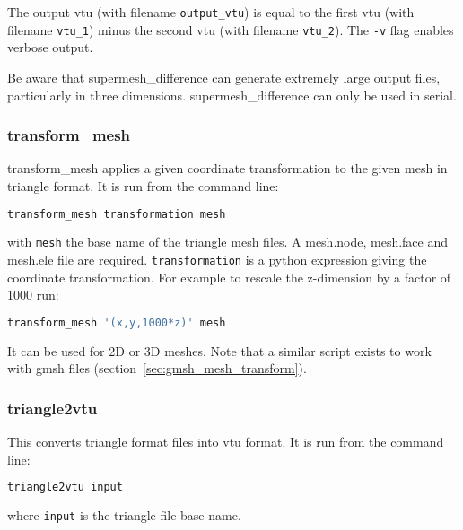 The output vtu (with filename \lstinline[language = Bash]+output_vtu+)
is equal to the first vtu (with filename \lstinline[language = Bash]+vtu_1+)
minus the second vtu (with filename \lstinline[language = Bash]+vtu_2+).  The
\lstinline[language = Bash]+-v+ flag enables verbose output.

Be aware that supermesh\_difference can generate extremely large output files,
particularly in three dimensions. supermesh\_difference can only be used in
serial.


\subsubsection{transform\_mesh}
\label{sec:transform_mesh}

transform\_mesh applies a given coordinate transformation to the given mesh in triangle format. It is run from the command line:
\begin{lstlisting}[language = Bash]
transform_mesh transformation mesh
\end{lstlisting}
with \lstinline[language = Bash]+mesh+ the base name of the triangle mesh files. A mesh.node, mesh.face and mesh.ele file are required. \lstinline[language = Bash]+transformation+ is a python expression giving the coordinate transformation. For example to rescale the z-dimension by a factor of 1000 run:
\begin{lstlisting}[language = Bash]
transform_mesh '(x,y,1000*z)' mesh
\end{lstlisting}
It can be used for 2D or 3D meshes. Note that a similar script exists to work with gmsh files (section~\ref{sec:gmsh_mesh_transform}).


\subsubsection{triangle2vtu}
\label{sec:triangle2vtu}
This converts triangle format files into vtu format. It is run from the command line:

\begin{lstlisting}[language = Bash]
triangle2vtu input
\end{lstlisting}

where \lstinline+input+ is the triangle file base name.


